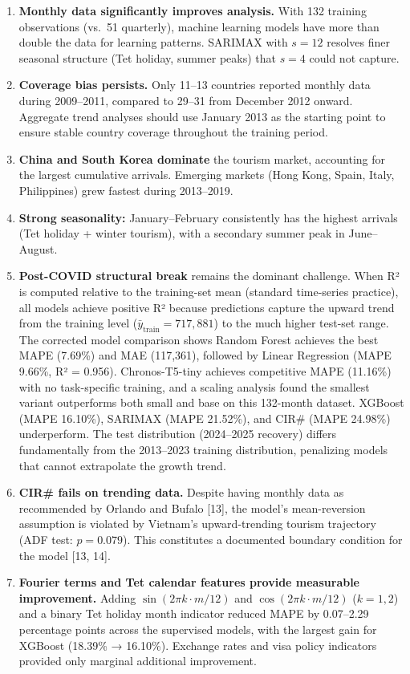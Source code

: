 \documentclass[
]{article}
\begin{document}
\begin{enumerate}
\def\labelenumi{\arabic{enumi}.}
\item
  \textbf{Monthly data significantly improves analysis.} With 132
  training observations (vs.~51 quarterly), machine learning models have
  more than double the data for learning patterns. SARIMAX with
  \(s = 12\) resolves finer seasonal structure (Tet holiday, summer
  peaks) that \(s = 4\) could not capture.
\item
  \textbf{Coverage bias persists.} Only 11--13 countries reported
  monthly data during 2009--2011, compared to 29--31 from December 2012
  onward. Aggregate trend analyses should use January 2013 as the
  starting point to ensure stable country coverage throughout the
  training period.
\item
  \textbf{China and South Korea dominate} the tourism market, accounting
  for the largest cumulative arrivals. Emerging markets (Hong Kong,
  Spain, Italy, Philippines) grew fastest during 2013--2019.
\item
  \textbf{Strong seasonality:} January--February consistently has the
  highest arrivals (Tet holiday + winter tourism), with a secondary
  summer peak in June--August.
\item
  \textbf{Post-COVID structural break} remains the dominant challenge.
  When R² is computed relative to the training-set mean (standard
  time-series practice), all models achieve positive R² because
  predictions capture the upward trend from the training level
  (\(\bar{y}_{\mathrm{train}} = 717{,}881\)) to the much higher test-set
  range. The corrected model comparison shows Random Forest achieves the
  best MAPE (7.69\%) and MAE (117,361), followed by Linear Regression
  (MAPE 9.66\%, R² = 0.956). Chronos-T5-tiny achieves competitive MAPE
  (11.16\%) with no task-specific training, and a scaling analysis found
  the smallest variant outperforms both small and base on this 132-month
  dataset. XGBoost (MAPE 16.10\%), SARIMAX (MAPE 21.52\%), and CIR\#
  (MAPE 24.98\%) underperform. The test distribution (2024--2025
  recovery) differs fundamentally from the 2013--2023 training
  distribution, penalizing models that cannot extrapolate the growth
  trend.
\item
  \textbf{CIR\# fails on trending data.} Despite having monthly data as
  recommended by Orlando and Bufalo {[}13{]}, the model's mean-reversion
  assumption is violated by Vietnam's upward-trending tourism trajectory
  (ADF test: \(p = 0.079\)). This constitutes a documented boundary
  condition for the model {[}13, 14{]}.
\item
  \textbf{Fourier terms and Tet calendar features provide measurable
  improvement.} Adding \(\sin(2\pi k \cdot m/12)\) and
  \(\cos(2\pi k \cdot m/12)\) (\(k=1,2\)) and a binary Tet holiday month
  indicator reduced MAPE by 0.07--2.29 percentage points across the
  supervised models, with the largest gain for XGBoost (18.39\% →
  16.10\%). Exchange rates and visa policy indicators provided only
  marginal additional improvement.
\end{enumerate}
\end{document}
